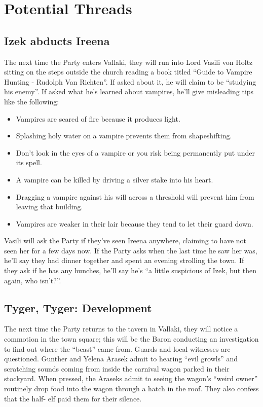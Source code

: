 \documentclass[a4paper,11pt]{article}
\begin{document}
\section{Potential Threads}
\label{sec:PotentialThreads}
\subsection{Izek abducts Ireena}
The next time the Party enters Vallaki, they will run into Lord Vasili von Holtz sitting on the steps outside the church reading a book titled ``Guide to Vampire Hunting - Rudolph Van Richten''. If asked about it, he will claim to be ``studying his enemy''. If asked what he's learned about vampires, he'll give misleading tips like the following:
\begin{itemize}
  \item Vampires are scared of fire because it produces light.
  \item Splashing holy water on a vampire prevents them from shapeshifting.
  \item Don't look in the eyes of a vampire or you risk being permanently put under its spell.
  \item A vampire can be killed by driving a silver stake into his heart.
  \item Dragging a vampire against his will across a threshold will prevent him from leaving that building.
  \item Vampires are weaker in their lair because they tend to let their guard down.
\end{itemize}
Vasili will ask the Party if they've seen Ireena anywhere, claiming to have not seen her for a few days now. If 
the Party asks when the last time he saw her was, he'll say they had dinner together and spent an evening 
strolling the town. If they ask if he has any hunches, he'll say he's ``a little suspicious of Izek, but then 
again, who isn't?''.

\subsection{Tyger, Tyger: Development}
The next time the Party returns to the tavern in Vallaki, they will notice a commotion in the town square; this 
will be the Baron conducting an investigation to find out where the ``beast'' came from. Guards and local 
witnesses are questioned. Gunther and Yelena Arasek admit to hearing ``evil growls'' and scratching sounds coming 
from inside the carnival wagon parked in their stockyard. When pressed, the Araseks admit to seeing the wagon's 
``weird owner'' routinely drop food into the wagon through a hatch in the roof. They also confess that the half-
elf paid them for their silence.
\end{document}
